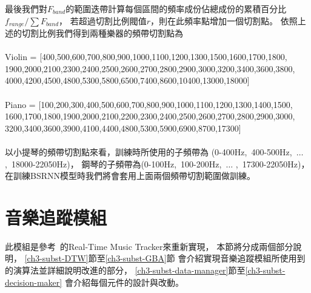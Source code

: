 \documentclass[class=NCU_thesis, crop=false]{standalone}
\begin{document}
最後我們對$F_{band}$的範圍迭帶計算每個區間的頻率成份佔總成份的累積百分比$f_{range}/\sum F_{band}$，
若超過切割比例閥值$r$，則在此頻率點增加一個切割點。
依照上述的切割比例我們得到兩種樂器的頻帶切割點為 \\
\\
Violin = [400,500,600,700,800,900,1000,1100,1200,1300,1500,1600,1700,1800,\\
1900,2000,2100,2300,2400,2500,2600,2700,2800,2900,3000,3200,3400,3600,3800,\\
4000,4200,4500,4800,5300,5800,6500,7400,8600,10400,13000,18000]\\
\\
Piano = [100,200,300,400,500,600,700,800,900,1000,1100,1200,1300,1400,1500,\\
1600,1700,1800,1900,2000,2100,2200,2300,2400,2500,2600,2700,2800,2900,3000,\\
3200,3400,3600,3900,4100,4400,4800,5300,5900,6900,8700,17300]\\
\\
以小提琴的頻帶切割點來看，訓練時所使用的子頻帶為
(0-400Hz,\ 400-500Hz,\ $\dots$ ,\ 18000-22050Hz)，
鋼琴的子頻帶為(0-100Hz,\ 100-200Hz,\ $\dots$ ,\ 17300-22050Hz)，
在訓練BSRNN模型時我們將會套用上面兩個頻帶切割範圍做訓練。

\pagebreak

\section{音樂追蹤模組} \label{ch3-st-music-tracking-module}
此模組是參考~\cite{Lin2020AHumanComputerDuetSystem}的Real-Time Music Tracker來重新實現，
本節將分成兩個部分說明，
\ref{ch3-subst-DTW}節至\ref{ch3-subst-GBA}節
會介紹實現音樂追蹤模組所使用到的演算法並詳細說明改進的部分，
\ref{ch3-subst-data-manager}節至\ref{ch3-subst-decision-maker}
會介紹每個元件的設計與改動。
\end{document}
